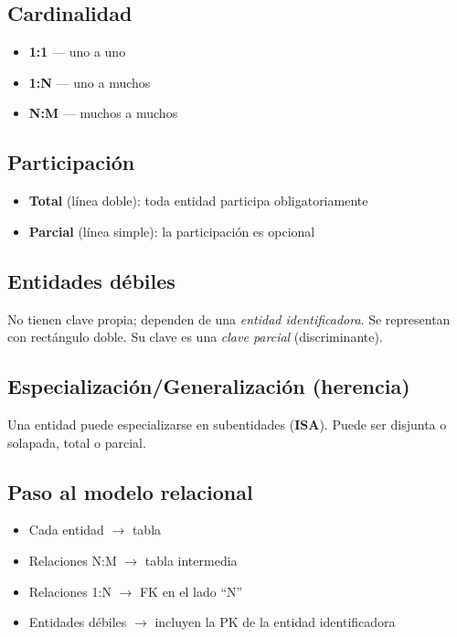 \documentclass[12pt, a4paper]{article}
\begin{document}
\subsection{Cardinalidad}
\begin{itemize}
  \item \textbf{1:1} — uno a uno
  \item \textbf{1:N} — uno a muchos
  \item \textbf{N:M} — muchos a muchos
\end{itemize}

\subsection{Participación}
\begin{itemize}
  \item \textbf{Total} (línea doble): toda entidad participa obligatoriamente
  \item \textbf{Parcial} (línea simple): la participación es opcional
\end{itemize}

\subsection{Entidades débiles}
No tienen clave propia; dependen de una \textit{entidad identificadora}. Se representan con rectángulo doble. Su clave es una \textit{clave parcial} (discriminante).

\subsection{Especialización/Generalización (herencia)}
Una entidad puede especializarse en subentidades (\textbf{ISA}). Puede ser disjunta o solapada, total o parcial.

\subsection{Paso al modelo relacional}
\begin{itemize}
  \item Cada entidad $\rightarrow$ tabla
  \item Relaciones N:M $\rightarrow$ tabla intermedia
  \item Relaciones 1:N $\rightarrow$ FK en el lado ``N''
  \item Entidades débiles $\rightarrow$ incluyen la PK de la entidad identificadora
\end{itemize}
\end{document}
